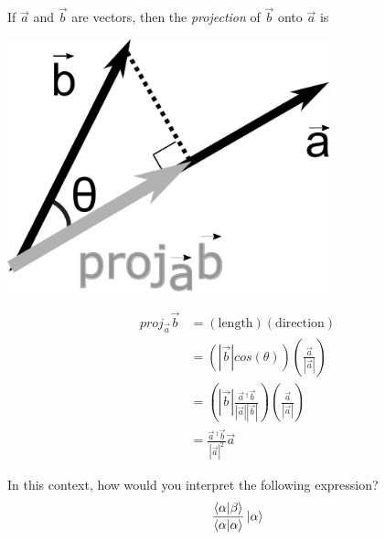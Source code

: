 \begin{questions}
		\question If $\vec a$ and $\vec b$ are vectors, then the \emph{projection} of $\vec{b}$ onto $\vec{a}$ is
			\begin{center}
			\begin{minipage}{0.4\textwidth}
					\includegraphics[width=0.7\textwidth]{includes/states-funcs-vecs-FIGURES/vector_projection.pdf}
			\end{minipage}
			\begin{minipage}{0.4\textwidth}
					\begin{align*}
						proj_{\vec a}\vec{b} &= \left(\text{length}\right)\left(\text{direction}\right) \\
						&= \left(|\vec{b}|cos(\theta)\right)\left( \frac{\vec{a}}{|\vec{a}|}\right) \\
							&= \left(|\vec{b}|\frac{\vec{a}\,^\dag\vec{b}}{|\vec{a}||\vec{b}|}\right)\left( \frac{\vec{a}}{|\vec{a}|}\right) \\
							&= \frac{\vec a\,^\dag \vec{b}}{|\vec{a}|^2}\vec{a} 
					\end{align*}
			\end{minipage}
			\end{center}
		
			\vspace{0.2in}
			In this context, how would you interpret the following expression? 
			\begin{equation*}		
				\frac{\braket{\alpha|\beta}}{\braket{\alpha|\alpha}}\ket{\alpha}
			\end{equation*}
			
			\begin{solution}[1.7in]
			\end{solution}

	\end{questions}

	\stophere